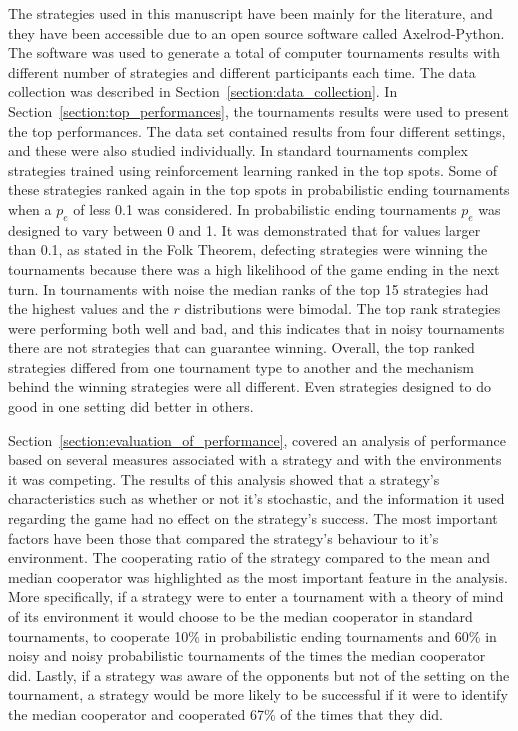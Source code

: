 The \numberofstrategies strategies used in this manuscript have been mainly for
the literature, and they have been accessible due to an open source software
called Axelrod-Python. The software was used to generate a total of
\numberofalltournaments computer tournaments results with different number of
strategies and different participants each time. The data collection was
described in Section~\ref{section:data_collection}. In
Section~\ref{section:top_performances}, the tournaments results were used to
present the top performances. The data set contained results from four different
settings, and these were also studied individually. In standard tournaments
complex strategies trained using reinforcement learning ranked in the top spots.
Some of these strategies ranked again in the top spots in probabilistic
ending tournaments when a \(p_e\) of less 0.1 was considered. In probabilistic
ending tournaments \(p_e\) was designed to vary between 0 and 1. It was demonstrated
that for values larger than 0.1, as stated in the Folk Theorem, defecting strategies
were winning the tournaments because there was a high likelihood of the game
ending in the next turn. In tournaments with noise the median ranks of the top
15 strategies had the highest values and the \(r\) distributions were bimodal.
The top rank strategies were performing both well and bad, and this indicates
that in noisy tournaments there are not strategies that can guarantee winning.
Overall, the top ranked strategies differed from one tournament type to
another and the mechanism behind the winning strategies were all different.
Even strategies designed to do good in one setting did better in others.

Section~\ref{section:evaluation_of_performance}, covered an analysis of
performance based on several measures associated with a strategy and with the
environments it was competing. The results of this analysis showed that a
strategy's characteristics such as whether or not it's stochastic, and the information it
used regarding the game had no effect on the strategy's success. The most
important factors have been those that compared the strategy's behaviour to it's
environment. The cooperating ratio of the strategy compared to the mean and
median cooperator was highlighted as the most important feature in the analysis.
More specifically, if a strategy were to enter a tournament with a theory of
mind of its environment it would choose to be the median cooperator in standard
tournaments, to cooperate 10\% in probabilistic ending tournaments and 
60\% in noisy and noisy probabilistic
tournaments of the times the median cooperator did. Lastly, if a strategy was aware of the opponents but not of the
setting on the tournament, a strategy would be more likely to be successful if
it were to identify the median cooperator and cooperated 67\% of the times that
they did.

